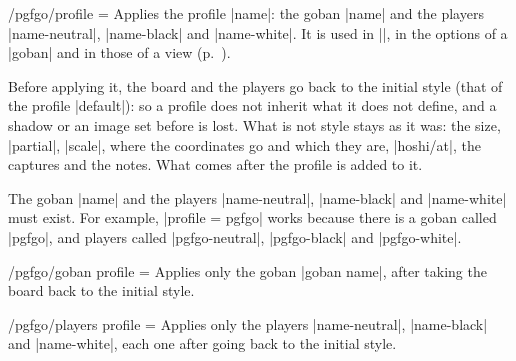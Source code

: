 \begin{key}{/pgfgo/profile = }
	Applies the profile |name|: the goban |name| and the players |name-neutral|, |name-black| and |name-white|. It is used in |\pgfgoset|, in the options of a |goban| and in those of a view (p.~\pageref{subsec:vistas}).

	Before applying it, the board and the players go back to the initial style (that of the profile |default|): so a profile does not inherit what it does not define, and a shadow or an image set before is lost. What is not style stays as it was: the size, |partial|, |scale|, where the coordinates go and which they are, |hoshi/at|, the captures and the notes. What comes after the profile is added to it.

	\begin{codeexample}[width=3cm]
		\begin{goban}[3, profile = default]
		\end{goban}
	\end{codeexample}

	The goban |name| and the players |name-neutral|, |name-black| and |name-white| must exist. For example, |profile = pgfgo| works because there is a goban called |pgfgo|, and players called |pgfgo-neutral|, |pgfgo-black| and |pgfgo-white|.
\end{key}

\begin{key}{/pgfgo/goban profile = }
	Applies only the goban |goban name|, after taking the board back to the initial style.
\end{key}

\begin{key}{/pgfgo/players profile = }
	Applies only the players |name-neutral|, |name-black| and |name-white|, each one after going back to the initial style.

	\begin{codeexample}[]
		\begin{goban}[3, goban profile = pgfgo]
		\end{goban}

		\begin{goban}[3, players profile = pgfgo]
		\end{goban}
	\end{codeexample}
\end{key}

